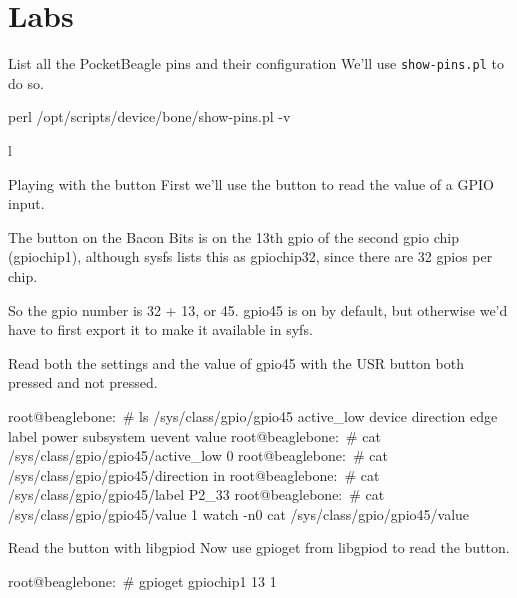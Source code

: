 \clearpage\section{Labs}\begin{Lab}


\begin{exe} {List all the PocketBeagle pins and their configuration}
   We'll use \verb?show-pins.pl? to do so.

   \begin{sol}
      \begin{raw}
perl /opt/scripts/device/bone/show-pins.pl -v
    
l \end{raw}
   \end{sol}
\end{exe}

\begin{exe} {Playing with the button}
   First we'll use the button to read the value of a GPIO input.

   The button on the Bacon Bits is on the 13th gpio of the second gpio chip
   (gpiochip1), although sysfs lists this as gpiochip32, since there are
   32 gpios per chip.

   So the gpio number is 32 + 13, or 45. gpio45 is on by default, but
   otherwise we'd have to first export it to make it available in syfs.

   Read both the settings and the value of gpio45 with the USR button both
   pressed and not pressed.

   \begin{sol}
      \begin{raw}
root@beaglebone:~# ls /sys/class/gpio/gpio45
active_low  device  direction  edge  label  power  subsystem  uevent  value
root@beaglebone:~# cat /sys/class/gpio/gpio45/active_low 
0
root@beaglebone:~# cat /sys/class/gpio/gpio45/direction 
in
root@beaglebone:~# cat /sys/class/gpio/gpio45/label 
P2_33
root@beaglebone:~# cat /sys/class/gpio/gpio45/value 
1
watch -n0 cat /sys/class/gpio/gpio45/value
      \end{raw}
   \end{sol}
\end{exe}

\begin{exe} {Read the button with libgpiod}
   Now use gpioget from libgpiod to read the button.

   \begin{sol}
      \begin{raw}
root@beaglebone:~# gpioget gpiochip1 13
1
      \end{raw}
   \end{sol}
\end{exe}


\end{Lab}
